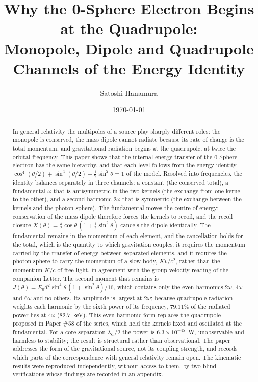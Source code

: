 \documentclass[%
 reprint, amsmath,amssymb, aps, prb, ]{revtex4-2}
\numberwithin{equation}{section}
\begin{document}
\title{Why the 0-Sphere Electron Begins at the Quadrupole:\\Monopole, Dipole and Quadrupole Channels of the Energy Identity}

\author{Satoshi Hanamura}

\date{\today}

\begin{abstract}
In general relativity the multipoles of a source play sharply different roles: the monopole is conserved, the mass dipole cannot radiate because its rate of change is the total momentum, and gravitational radiation begins at the quadrupole, at twice the orbital frequency.
This paper shows that the internal energy transfer of the 0-Sphere electron has the same hierarchy, and that each level follows from the energy identity $\cos^4(\theta/2) + \sin^4(\theta/2) + \tfrac12\sin^2\theta = 1$ of the model.
Resolved into frequencies, the identity balances separately in three channels: a constant (the conserved total), a fundamental $\omega$ that is antisymmetric in the two kernels (the exchange from one kernel to the other), and a second harmonic $2\omega$ that is symmetric (the exchange between the kernels and the photon sphere).
The fundamental moves the centre of energy; conservation of the mass dipole therefore forces the kernels to recoil, and the recoil closure $X(\theta) = \tfrac{d}{2}\cos\theta\,(1 + \tfrac12\sin^2\theta)$ cancels the dipole identically. The fundamental remains in the momentum of each element, and the cancellation holds for the total, which is the quantity to which gravitation couples; it requires the momentum carried by the transfer of energy between separated elements, and it requires the photon sphere to carry the momentum of a slow body, $Kv/c^2$, rather than the momentum $K/c$ of free light, in agreement with the group-velocity reading of the companion Letter.
The second moment that remains is $J(\theta) = E_0d^2\sin^4\theta\,(1 + \sin^2\theta)/16$, which contains only the even harmonics $2\omega$, $4\omega$ and $6\omega$ and no others.
Its amplitude is largest at $2\omega$; because quadrupole radiation weights each harmonic by the sixth power of its frequency, $79.11\%$ of the radiated power lies at $4\omega$ ($82.7$~keV).
This even-harmonic form replaces the quadrupole proposed in Paper \#58 of the series, which held the kernels fixed and oscillated at the fundamental.
For a core separation $\lambda_C/2$ the power is $6.3\times10^{-45}$~W, unobservable and harmless to stability; the result is structural rather than observational.
The paper addresses the form of the gravitational source, not its coupling strength, and records which parts of the correspondence with general relativity remain open. The kinematic results were reproduced independently, without access to them, by two blind verifications whose findings are recorded in an appendix.
\end{abstract}
\end{document}
